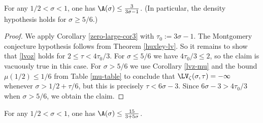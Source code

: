 \begin{theorem}\label{huxley-bound}\cite{Huxley} For any $1/2 < \sigma < 1$, one has $\A(\sigma) \leq \frac{3}{3\sigma-1}$. (In particular, the density hypothesis holds for $\sigma \geq 5/6$.)
\end{theorem}
\literature
{}
\derived
{}

\begin{proof} We apply Corollary \ref{zero-large-cor3} with $\tau_0 := 3\sigma-1$.  The Montgomery conjecture hypothesis follows from Theorem \ref{huxley-lv}. So it remains to show that \eqref{lvoz} holds for $2 \leq \tau < 4\tau_0/3$.  For $\sigma \leq 5/6$ we have $4\tau_0/3 \leq 2$, so the claim is vacuously true in this case.  For $\sigma > 5/6$ we use Corollary \ref{lvz-mu} and the bound $\mu(1/2) \leq 1/6$ from Table \ref{mu-table} to conclude that
$\LV_\zeta(\sigma,\tau) = -\infty$ whenever $\sigma > 1/2 + \tau/6$, but this is precisely $\tau < 6\sigma - 3$.  Since $6\sigma-3 > 4\tau_0/3$ when $\sigma > 5/6$, we obtain the claim.
\end{proof}

\begin{theorem}\label{guth-maynard-density}  For any $1/2 < \sigma < 1$, one has $\A(\sigma) \leq \frac{15}{3+5\sigma}$.
\end{theorem}
\literature
{}
\derived
{}

